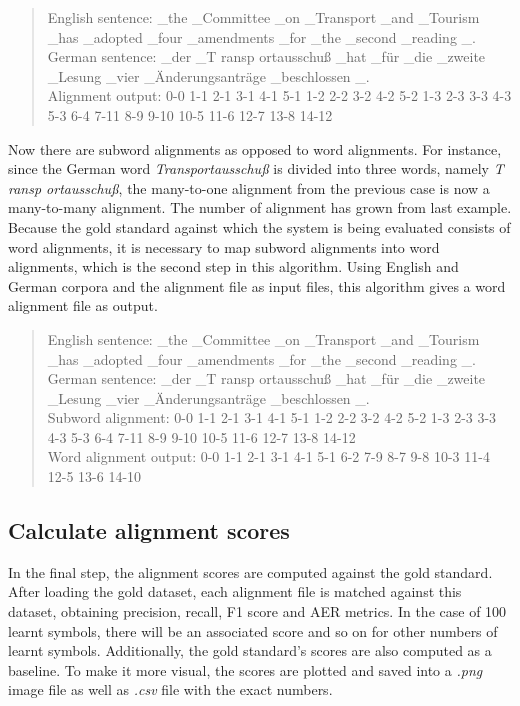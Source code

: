 \begin{quote}
	English sentence: \_the \_Committee \_on \_Transport \_and \_Tourism \_has \_adopted \_four \_amendments \_for \_the \_second \_reading \_.\\
	German sentence: \_der \_T ransp ortausschuß \_hat \_für \_die \_zweite \_Lesung \_vier \_Änderungsanträge \_beschlossen \_.\\
	Alignment output: 0-0 1-1 2-1 3-1 4-1 5-1 1-2 2-2 3-2 4-2 5-2 1-3 2-3 3-3 4-3 5-3 6-4 7-11 8-9 9-10 10-5 11-6 12-7 13-8 14-12
\end{quote}

Now there are subword alignments as opposed to word alignments. For instance, since the German word \emph{Transportausschuß} is divided into three words, namely \emph{T ransp ortausschuß}, the many-to-one alignment from the previous case is now a many-to-many alignment. The number of alignment has grown from last example. Because the gold standard against which the system is being evaluated consists of word alignments, it is necessary to map subword alignments into word alignments, which is the second step in this algorithm. Using English and German corpora and the alignment file as input files, this algorithm gives a word alignment file as output.

\begin{quote}
	English sentence: \_the \_Committee \_on \_Transport \_and \_Tourism \_has \_adopted \_four \_amendments \_for \_the \_second \_reading \_.\\
	German sentence: \_der \_T ransp ortausschuß \_hat \_für \_die \_zweite \_Lesung \_vier \_Änderungsanträge \_beschlossen \_.\\
	Subword alignment: 0-0 1-1 2-1 3-1 4-1 5-1 1-2 2-2 3-2 4-2 5-2 1-3 2-3 3-3 4-3 5-3 6-4 7-11 8-9 9-10 10-5 11-6 12-7 13-8 14-12\\
	Word alignment output: 0-0 1-1 2-1 3-1 4-1 5-1 6-2 7-9 8-7 9-8 10-3 11-4 12-5 13-6 14-10
\end{quote}

\subsection{Calculate alignment scores}

In the final step, the alignment scores are computed against the gold standard. After loading the gold dataset, each alignment file is matched against this dataset, obtaining precision, recall, F1 score and AER metrics. In the case of 100 learnt symbols, there will be an associated score and so on for other numbers of learnt symbols. Additionally, the gold standard's scores are also computed as a baseline. To make it more visual, the scores are plotted and saved into a \emph{.png} image file as well as \emph{.csv} file with the exact numbers.

